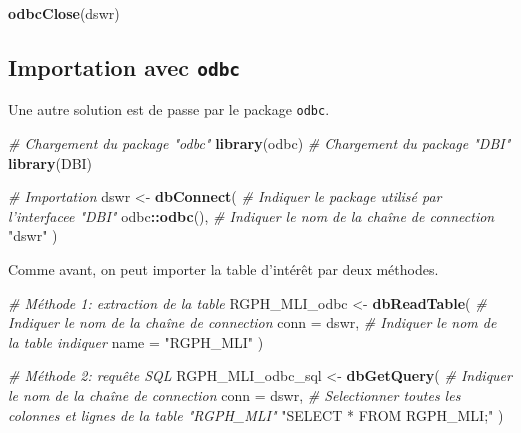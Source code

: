 \documentclass[]{book}
\newenvironment{Shaded}{\begin{snugshade}}{\end{snugshade}}
\newcommand{\KeywordTok}[1]{\textcolor[rgb]{0.13,0.29,0.53}{\textbf{#1}}}
\newcommand{\DataTypeTok}[1]{\textcolor[rgb]{0.13,0.29,0.53}{#1}}
\newcommand{\StringTok}[1]{\textcolor[rgb]{0.31,0.60,0.02}{#1}}
\newcommand{\CommentTok}[1]{\textcolor[rgb]{0.56,0.35,0.01}{\textit{#1}}}
\newcommand{\OperatorTok}[1]{\textcolor[rgb]{0.81,0.36,0.00}{\textbf{#1}}}
\newcommand{\NormalTok}[1]{#1}
\begin{document}
\begin{Shaded}
\begin{Highlighting}[]
\KeywordTok{odbcClose}\NormalTok{(dswr)}
\end{Highlighting}
\end{Shaded}

\subsection{\texorpdfstring{Importation avec
\texttt{odbc}}{Importation avec odbc}}\label{importation-avec-odbc}

Une autre solution est de passe par le package \texttt{odbc}.

\begin{Shaded}
\begin{Highlighting}[]
\CommentTok{# Chargement du package "odbc"}
\KeywordTok{library}\NormalTok{(odbc)}
\CommentTok{# Chargement du package "DBI"}
\KeywordTok{library}\NormalTok{(DBI) }

\CommentTok{# Importation}
\NormalTok{dswr <-}\StringTok{ }\KeywordTok{dbConnect}\NormalTok{(}
  \CommentTok{# Indiquer le package utilisé par l'interfacee "DBI"}
\NormalTok{  odbc}\OperatorTok{::}\KeywordTok{odbc}\NormalTok{(), }
  \CommentTok{# Indiquer le nom de la chaîne de connection}
  \StringTok{"dswr"}
\NormalTok{  )}
\end{Highlighting}
\end{Shaded}

Comme avant, on peut importer la table d'intérêt par deux méthodes.

\begin{Shaded}
\begin{Highlighting}[]
\CommentTok{# Méthode 1: extraction de la table}
\NormalTok{RGPH_MLI_odbc <-}\StringTok{ }\KeywordTok{dbReadTable}\NormalTok{(}
  \CommentTok{# Indiquer le nom de la chaîne de connection}
  \DataTypeTok{conn =}\NormalTok{ dswr, }
  \CommentTok{# Indiquer le nom de la table indiquer}
  \DataTypeTok{name =} \StringTok{"RGPH_MLI"}
\NormalTok{  ) }

\CommentTok{# Méthode 2: requête SQL}
\NormalTok{RGPH_MLI_odbc_sql <-}\StringTok{ }\KeywordTok{dbGetQuery}\NormalTok{(}
  \CommentTok{# Indiquer le nom de la chaîne de connection}
  \DataTypeTok{conn =}\NormalTok{ dswr, }
  \CommentTok{# Selectionner toutes les colonnes et lignes de la table "RGPH_MLI"}
  \StringTok{"SELECT * FROM RGPH_MLI;"}
\NormalTok{  )}
\end{Highlighting}
\end{Shaded}
\end{document}
